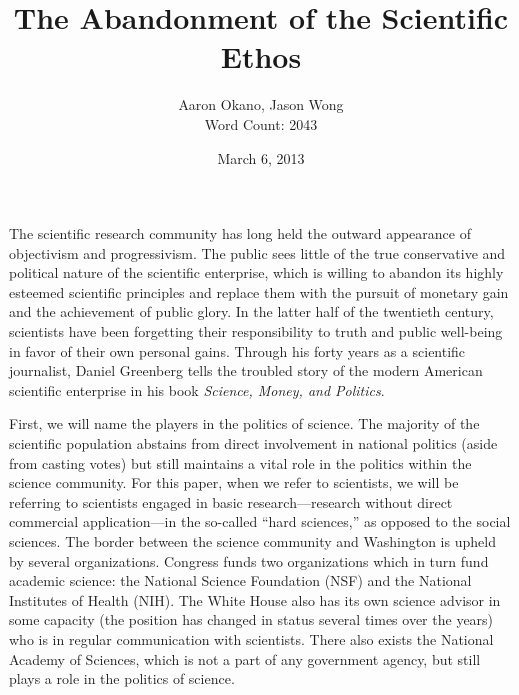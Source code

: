 \documentclass{article}[12pt]
\title{The Abandonment of the Scientific Ethos}  %
\author{Aaron Okano, Jason Wong\\Word Count: 2043 }    %
\date{March 6, 2013}   %
\begin{document}

\maketitle                 %

The scientific research community has long held the outward appearance of
objectivism and progressivism. The public sees little of the true conservative
and political nature of the scientific enterprise, which is willing to abandon
its highly esteemed scientific principles and replace them with the pursuit
of monetary gain and the achievement of public glory. In the latter half of the
twentieth century, scientists have been forgetting their responsibility to
truth and public well-being in favor of their own personal gains. Through his
forty years as a scientific journalist, Daniel Greenberg tells the troubled
story of the modern American scientific enterprise in his book \emph{Science,
Money, and Politics}.

First, we will name the players in the politics of science. The majority of the
scientific population abstains from direct involvement in national politics
(aside from casting votes) but still maintains a vital role in the politics
within the science community. For this paper, when we refer to scientists, we
will be referring to scientists engaged in basic research---research without
direct commercial application---in the so-called ``hard sciences,'' as opposed
to the social sciences. The border between the science community and Washington
is upheld by several organizations. Congress funds two organizations which in
turn fund academic science: the National Science Foundation (NSF) and the
National Institutes of Health (NIH). The White House also has its own science
advisor in some capacity (the position has changed in status several times over
the years) who is in regular communication with scientists. There also exists
the National Academy of Sciences, which is not a part of any government agency,
but still plays a role in the politics of science.
\end{document}
